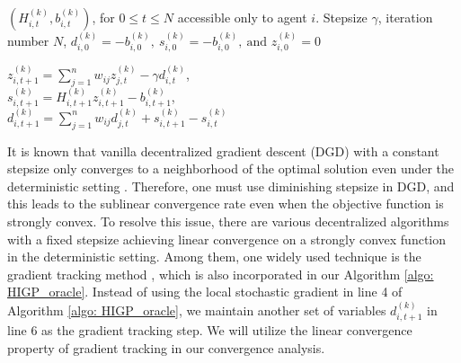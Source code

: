 \documentclass{article}
\theoremstyle{plain}
\theoremstyle{definition}
\theoremstyle{remark}
\begin{document}
\begin{algorithm}[ht]
    \caption{Hessian-Inverse-Gradient Product oracle}\label{algo: HIGP_oracle}
    \begin{algorithmic}[1]
         $(H_{i,t}^{(k)}, b_{i,t}^{(k)})$, for $0\leq t\leq N$ accessible only to agent $i$. Stepsize $\gamma$, iteration number $N$, $d_{i,0}^{(k)} = -b_{i,0}^{(k)},\ s_{i,0}^{(k)} = - b_{i,0}^{(k)},\ \text{and } z_{i,0}^{(k)} = 0$
        
                \STATE $z_{i,t+1}^{(k)} = \sum_{j=1}^{n}w_{ij}z_{j,t}^{(k)} - \gamma d_{i,t}^{(k)}$, \\
                \STATE $s_{i,t+1}^{(k)} = H_{i,t+1}^{(k)}z_{i,t+1}^{(k)}- b_{i,t+1}^{(k)}$, \\
                \STATE $d_{i,t+1}^{(k)} =\sum_{j=1}^{n}w_{ij}d_{j,t}^{(k)} + s_{i,t+1}^{(k)} - s_{i,t}^{(k)}$
            \ENDFOR
        \ENDFOR
    \end{algorithmic}
\end{algorithm}
It is known that vanilla decentralized gradient descent (DGD) with a constant stepsize only converges to a neighborhood of the optimal solution even under the deterministic setting \citep{yuan2016convergence}. Therefore, one must use diminishing stepsize in DGD, and this leads to the sublinear convergence rate even when the objective function is strongly convex. To resolve this issue, there are various decentralized algorithms with a fixed stepsize \citep{xu2015augmented, shi2015extra, di2016next, nedic2017achieving, qu2017harnessing} achieving linear convergence on a strongly convex function  in the deterministic setting. Among them, one widely used technique is the gradient tracking method \citep{xu2015augmented, qu2017harnessing, nedic2017achieving, pu2021distributed}, which is also incorporated in our Algorithm \ref{algo: HIGP_oracle}. Instead of using the local stochastic gradient in line 4 of Algorithm \ref{algo: HIGP_oracle}, we maintain another set of variables $d_{i,t+1}^{(k)}$ in line 6 as the gradient tracking step. We will utilize the linear convergence property of gradient tracking in our convergence analysis.
\end{document}
